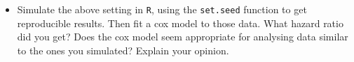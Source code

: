 \begin{enumerate}[(a)]
\begin{itemize}
\item Simulate the above setting in \verb|R|, using the \verb|set.seed| function to get reproducible results. Then fit a cox model to those data. What hazard ratio did you get? Does the cox model seem appropriate for analysing data similar to the ones you simulated? Explain your opinion.
\end{itemize}
\end{enumerate}